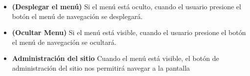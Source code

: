     \begin{itemize}
    
    \item
    {\bf \IUMenu (Desplegar el menú)}
        Si el menú está oculto, cuando el usuario presione el botón \IUMenu el menú de
        navegación se desplegará.

    \item {\bf \IUMenu (Ocultar Menu)}
        Si el menú está visible, cuando el usuario presione el botón \IUMenu el menú de
        navegación se ocultará.

    \item {\bf \IUAdminSitio Administración del sitio }
        Cuando el menú está visible, el botón de administración del sitio nos permitirá
        navegar a la pantalla 

    \end{itemize}
